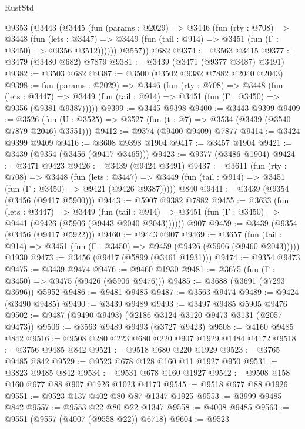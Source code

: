 \begin{lexlean}{RustStd}
\begin{coremodule}
    @9353
      (@3443
        (@3445
          (fun (params : @2029) =>
          @3446
            (fun (rty : @708) =>
            @3448
              (fun (lets : @3447) =>
              @3449 (fun (tail : @914) => @3451 (fun (Γ : @3450) => @9356 @3512))))))
        @3557))
    @682
@9374 := @3563 @3415
@9377 := @3479 (@3480 @682) @7879
@9381 := @3439 (@3471 (@9377 @3487) @3491)
@9382 := @3503 @682
@9387 := @3500 (@3502 @9382 @7882 @2040 @2043)
@9398 := fun (params : @2029) =>
  @3446
    (fun (rty : @708) =>
    @3448
      (fun (lets : @3447) =>
      @3449 (fun (tail : @914) => @3451 (fun (Γ : @3450) => @9356 (@9381 @9387)))))
@9399 := @3445 @9398
@9400 := @3443 @9399
@9409 := @3526 (fun (U : @3525) => @3527 (fun (t : @7) => @3534 (@3439 (@3540 @7879 @2046) @3551)))
@9412 := @9374 (@9400 @9409) @7877
@9414 := @3424 @9399 @9409
@9416 := @3608 @9398 @1904
@9417 := @3457 @1904
@9421 := @3439 (@9354 (@3456 (@9417 @3465)))
@9423 := @9377 (@3486 @1904)
@9424 := @3471 @9423
@9426 := @3439 (@9424 @3491)
@9437 := @3611
    (fun (rty : @708) =>
    @3448
      (fun (lets : @3447) =>
      @3449 (fun (tail : @914) => @3451 (fun (Γ : @3450) => @9421 (@9426 @9387)))))
    @840
@9441 := @3439 (@9354 (@3456 (@9417 @5900)))
@9443 := @5907 @9382 @7882
@9455 := @3633
    (fun (lets : @3447) =>
    @3449
      (fun (tail : @914) => @3451 (fun (Γ : @3450) => @9441 (@9426 (@5906 (@9443 @2040 @2043))))))
    @907
@9459 := @3439 (@9354 (@3456 (@9417 @5922)))
@9460 := @9443 @907
@9469 := @3657
    (fun (tail : @914) => @3451 (fun (Γ : @3450) => @9459 (@9426 (@5906 (@9460 @2043)))))
    @1930
@9473 := @3456 (@9417 (@5899 (@3461 @1931)))
@9474 := @9354 @9473
@9475 := @3439 @9474
@9476 := @9460 @1930
@9481 := @3675 (fun (Γ : @3450) => @9475 (@9426 (@5906 @9476)))
@9485 := @3688 (@3691 (@7293 @3696)) @5952
@9486 := @9481 @9485
@9487 := @3563 @9474
@9489 := @9424 (@3490 @9485)
@9490 := @3439 @9489
@9493 := @3497 @9485 @5905 @9476
@9502 := @9487 (@9490 @9493) (@2186 @3124 @3120 @9473 @3131 (@2057 @9473))
@9506 := @3563 @9489 @9493 (@3727 @9423)
@9508 := @4160 @9485 @842
@9516 := @9508 @280 @223 @680 @220 @907 @1929 @1484 @4172
@9518 := @3756 @9485 @842
@9521 := @9518 @680 @220 @1929
@9523 := @3765 @9485 @842
@9529 := @9523 @678 @128 @160 @11 @1927 @950
@9531 := @3823 @9485 @842
@9534 := @9531 @678 @160 @1927
@9542 := @9508 @158 @160 @677 @88 @907 @1926 @1023 @4173
@9545 := @9518 @677 @88 @1926
@9551 := @9523 @137 @402 @80 @87 @1347 @1925
@9553 := @3999 @9485 @842
@9557 := @9553 @22 @80 @22 @1347
@9558 := @4008 @9485
@9563 := @9551 (@9557 (@4007 (@9558 @22)) @6718)
@9604 := @9523

\end{coremodule}
\end{lexlean}
